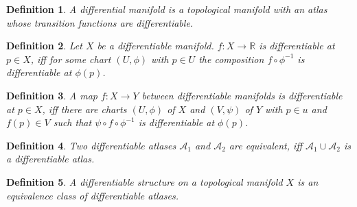\documentclass{scrartcl}
\newcommand{\R}{\mathbb R}
\newtheorem*{mydef}{Definition}
\begin{document}
\begin{mydef}
  A \emph{differential manifold} is a topological manifold with an atlas whose transition functions are differentiable.
\end{mydef}

\begin{mydef}
  Let $X$ be a differentiable manifold. $f:X \rightarrow \R$ is \emph{differentiable} at $p\in X$, iff for some chart $(U,\phi)$ with $p\in U$ the composition $f\circ \phi^{-1}$ is differentiable at $\phi(p)$.

\end{mydef}

\begin{mydef}
  A map $f: X \rightarrow Y$ between differentiable manifolds is differentiable at $p\in X$, iff there are charts $(U,\phi)$ of $X$ and $(V,\psi)$ of $Y$ with $p\in u$ and $f(p) \in V$ such that $\psi\circ f \circ \phi^{-1}$ is differentiable at $\phi(p)$.

\end{mydef}

\begin{mydef}
  Two differentiable atlases $\mathcal A_1$ and $\mathcal A_2$ are equivalent, iff $\mathcal A_1 \cup \mathcal A_2$ is a differentiable atlas.
\end{mydef}

\begin{mydef}
  A differentiable structure on a topological manifold $X$ is an equivalence class of differentiable atlases.
\end{mydef}
\end{document}
